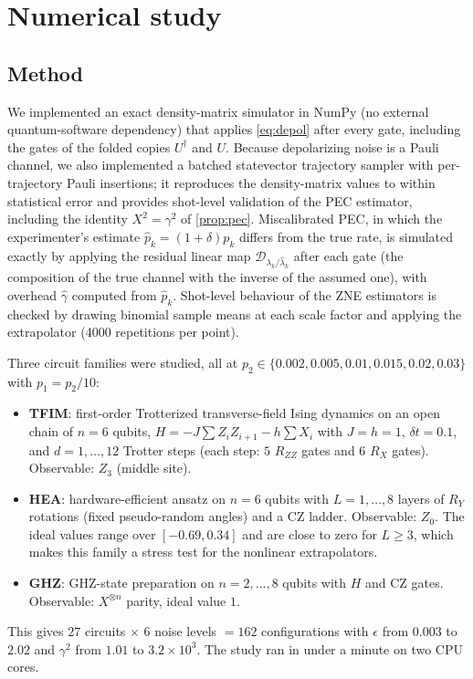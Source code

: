 \documentclass[11pt,a4paper]{article}
\theoremstyle{remark}
\newcommand{\eps}{\epsilon}
\begin{document}
\section{Numerical study}
\label{sec:numerics}

\subsection{Method}
We implemented an exact density-matrix simulator in NumPy (no external quantum-software dependency) that applies \cref{eq:depol} after every gate, including the gates of the folded copies $U^\dagger$ and $U$. Because depolarizing noise is a Pauli channel, we also implemented a batched statevector trajectory sampler with per-trajectory Pauli insertions; it reproduces the density-matrix values to within statistical error and provides shot-level validation of the PEC estimator, including the identity $X^2=\gamma^2$ of \cref{prop:pec}. Miscalibrated PEC, in which the experimenter's estimate $\hat p_k=(1+\delta)p_k$ differs from the true rate, is simulated exactly by applying the residual linear map $\mathcal D_{\lambda_k/\hat\lambda_k}$ after each gate (the composition of the true channel with the inverse of the assumed one), with overhead $\hat\gamma$ computed from $\hat p_k$. Shot-level behaviour of the ZNE estimators is checked by drawing binomial sample means at each scale factor and applying the extrapolator (4000 repetitions per point).

Three circuit families were studied, all at $p_2\in\{0.002,0.005,0.01,0.015,0.02,0.03\}$ with $p_1=p_2/10$:
\begin{itemize}
\item \textbf{TFIM}: first-order Trotterized transverse-field Ising dynamics on an open chain of $n=6$ qubits, $H=-J\sum Z_iZ_{i+1}-h\sum X_i$ with $J=h=1$, $\delta t=0.1$, and $d=1,\ldots,12$ Trotter steps (each step: $5$ $R_{ZZ}$ gates and $6$ $R_X$ gates). Observable: $Z_3$ (middle site).
\item \textbf{HEA}: hardware-efficient ansatz on $n=6$ qubits with $L=1,\ldots,8$ layers of $R_Y$ rotations (fixed pseudo-random angles) and a CZ ladder. Observable: $Z_0$. The ideal values range over $[-0.69,0.34]$ and are close to zero for $L\ge3$, which makes this family a stress test for the nonlinear extrapolators.
\item \textbf{GHZ}: GHZ-state preparation on $n=2,\ldots,8$ qubits with $H$ and CZ gates. Observable: $X^{\otimes n}$ parity, ideal value $1$.
\end{itemize}
This gives $27$ circuits $\times$ $6$ noise levels $=162$ configurations with $\eps$ from $0.003$ to $2.02$ and $\gamma^2$ from $1.01$ to $3.2\times10^3$. The study ran in under a minute on two CPU cores.
\end{document}
